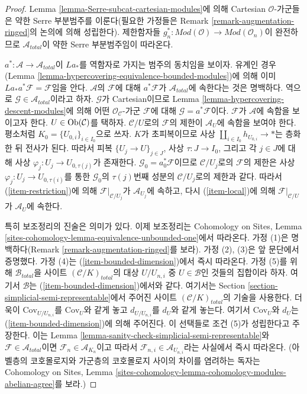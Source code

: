 \begin{proof}
Lemma \ref{lemma-Serre-subcat-cartesian-modules}에 의해 Cartesian
$\mathcal{O}$-가군들은 약한 Serre 부분범주를 이룬다(필요한 가정들은
Remark \ref{remark-augmentation-ringed}의 논의에 의해 성립한다).
제한함자들
$g_n^* : \textit{Mod}(\mathcal{O}) \to \textit{Mod}(\mathcal{O}_n)$이
완전하므로 $\mathcal{A}_{total}$이 약한 Serre 부분범주임이 따라온다.

\medskip\noindent
$a^* : \mathcal{A} \to \mathcal{A}_{total}$이 $La_*$를 역함자로 가지는
범주의 동치임을 보이자.
유계인 경우(Lemma
\ref{lemma-hypercovering-equivalence-bounded-modules})에 의해 이미
$La_*a^*\mathcal{F} = \mathcal{F}$임을 안다.
$\mathcal{A}$의 $\mathcal{F}$에 대해 $a^*\mathcal{F}$가
$\mathcal{A}_{total}$에 속한다는 것은 명백하다. 역으로
$\mathcal{G} \in \mathcal{A}_{total}$이라고 하자. $\mathcal{G}$가
Cartesian이므로 Lemma \ref{lemma-hypercovering-descent-modules}에 의해
어떤 $\mathcal{O}_\mathcal{C}$-가군 $\mathcal{F}$에 대해
$\mathcal{G} = a^*\mathcal{F}$이다. $\mathcal{F}$가 $\mathcal{A}$에
속함을 보이고자 한다. $U \in \mathop{\mathrm{Ob}}\nolimits(\mathcal{C})$를 택하자.
$\mathcal{C}/U$로의 $\mathcal{F}$의 제한이 $\mathcal{A}_U$에 속함을
보여야 한다. 평소처럼 $K_0 = \{U_{0, i}\}_{i \in I_0}$으로 쓰자.
$K$가 초피복이므로 사상 $\coprod_{i \in I_0} h_{U_{0, i}} \to *$는
층화한 뒤 전사가 된다. 따라서 피복 $\{U_j \to U\}_{j \in J}$,
사상 $\tau : J \to I_0$, 그리고 각 $j \in J$에 대해 사상
$\varphi_j : U_j \to U_{0, \tau(j)}$가 존재한다.
$\mathcal{G}_0 = a_0^*\mathcal{F}$이므로 $\mathcal{C}/U_j$로의
$\mathcal{F}$의 제한은 사상
$\varphi_j : U_j \to U_{0, \tau(i)}$를 통한 $\mathcal{G}_0$의
$\tau(j)$번째 성분의 $\mathcal{C}/U_j$로의 제한과 같다. 따라서
(\ref{item-restriction})에 의해
$\mathcal{F}|_{\mathcal{C}/U_j}$가 $\mathcal{A}_{U_j}$에 속하고,
다시 (\ref{item-local})에 의해
$\mathcal{F}|_{\mathcal{C}/U}$가 $\mathcal{A}_U$에 속한다.

\medskip\noindent
특히 보조정리의 진술은 의미가 있다. 이제 보조정리는 Cohomology on
Sites, Lemma \ref{sites-cohomology-lemma-equivalence-unbounded-one}에서
따라온다. 가정 (1)은 명백하다(Remark
\ref{remark-augmentation-ringed}를 보라). 가정 (2), (3)은 앞 문단에서
증명했다. 가정 (4)는 (\ref{item-bounded-dimension})에서 즉시 따라온다.
가정 (5)를 위해 $\mathcal{B}_{total}$을 사이트
$(\mathcal{C}/K)_{total}$의 대상 $U/U_{n, i}$ 중
$U \in \mathcal{B}$인 것들의 집합이라 하자. 여기서 $\mathcal{B}$는
(\ref{item-bounded-dimension})에서와 같다. 여기서는 Section
\ref{section-simplicial-semi-representable}에서 주어진 사이트
$(\mathcal{C}/K)_{total}$의 기술을 사용한다. 더욱이
$\text{Cov}_{U/U_{n, i}}$를 $\text{Cov}_U$와 같게 놓고
$d_{U/U_{n, i}}$를 $d_U$와 같게 놓는다. 여기서 $\text{Cov}_U$와
$d_U$는 (\ref{item-bounded-dimension})에 의해 주어진다. 이 선택들로
조건 (5)가 성립한다고 주장한다. 이는 Lemma
\ref{lemma-sanity-check-simplicial-semi-representable}와
$\mathcal{F} \in \mathcal{A}_{total}$이면
$\mathcal{F}_n \in \mathcal{A}_{K_n}$이고 따라서
$\mathcal{F}_{n, i} \in \mathcal{A}_{U_{n, i}}$라는 사실에서 즉시
따라온다. (아벨층의 코호몰로지와 가군층의 코호몰로지 사이의 차이를
염려하는 독자는 Cohomology on Sites, Lemma
\ref{sites-cohomology-lemma-cohomology-modules-abelian-agree}를 보라.)
\end{proof}

